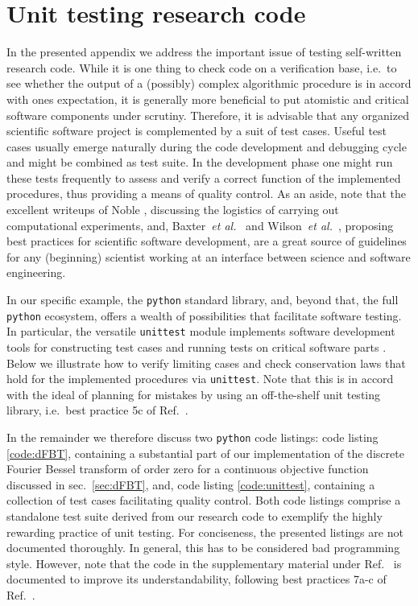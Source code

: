 \documentclass[12pt]{iopart}
\begin{document}
\section{Unit testing research code}
\label{sec:appendixA}

In the presented appendix we address the important issue of testing
self-written research code. While it is one thing to check code on a
verification base, i.e.\ to see whether the output of a (possibly) complex
algorithmic procedure is in accord with ones expectation, it is generally more
beneficial to put atomistic and critical software components under scrutiny.
Therefore, it is advisable that any organized scientific software project is
complemented by a suit of test cases. Useful test cases usually emerge naturally
during the code development and debugging cycle and might be combined as test
suite.  In the development phase one might run these tests frequently to
assess and verify a correct function of the implemented procedures, thus 
providing a means of quality control. 
As an aside, note that the excellent writeups of Noble \cite{Noble:2009},
discussing the logistics of carrying out computational experiments, and,
Baxter~{\emph{et al.}}~\cite{Baxter:2006} and Wilson~{\emph{et
al.}}~\cite{Wilson:2014}, proposing best practices for scientific software
development, are a great source of guidelines for any (beginning) scientist
working at an interface between science and software engineering. 

In our specific example, the {\tt python} standard library, and, beyond that,
the full {\tt python} ecosystem, offers a wealth of possibilities that
facilitate software testing.  In particular, the versatile {\tt unittest}
module implements software development tools for constructing test cases and
running tests on critical software parts \cite{Purcell:2003}.  Below we
illustrate how to verify limiting cases and check conservation laws that hold
for the implemented procedures via {\tt unittest}. Note that this is in accord
with the ideal of planning for mistakes by using an off-the-shelf unit testing
library, i.e.\ best practice 5c of Ref.\ \cite{Wilson:2014}.  

In the remainder we therefore discuss two {\tt{python}} code listings: code
listing \ref{code:dFBT}, containing a substantial part of our implementation of
the discrete Fourier Bessel transform of order zero for a continuous objective
function discussed in sec.\ \ref{sec:dFBT}, and, code listing
\ref{code:unittest}, containing a collection of test cases facilitating quality
control.  Both code listings comprise a standalone test suite derived from our
research code to exemplify the highly rewarding practice of unit testing.  For
conciseness, the presented listings are not documented thoroughly. In general,
this has to be considered bad programming style.  However, note that the code
in the supplementary material under Ref.\ \cite{Melchert_gitHub_dFBT:2016} is
documented to improve its understandability, following best practices 7a-c of
Ref.\ \cite{Wilson:2014}.
\end{document}
